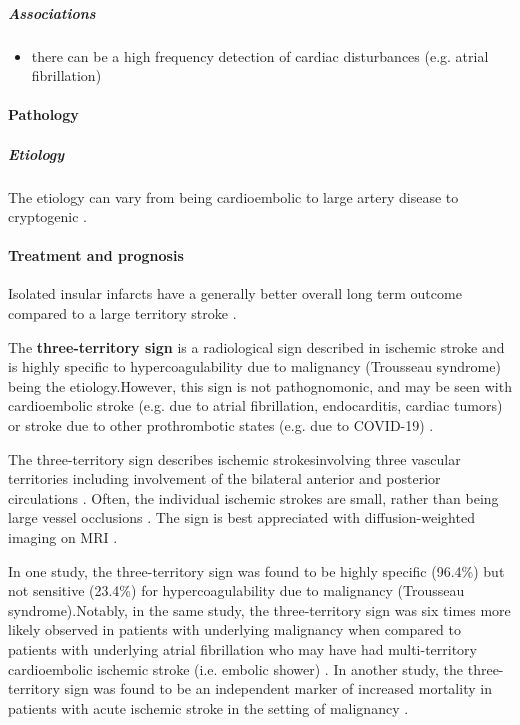\subparagraph{Associations}

\begin{itemize}
	\tightlist
	\item
	there can be a high frequency detection of cardiac disturbances (e.g. atrial fibrillation) 
\end{itemize}

\paragraph{Pathology}

\subparagraph{Etiology}

The etiology can vary from being cardioembolic to large artery disease to cryptogenic .

\paragraph{Treatment and prognosis}

Isolated insular infarcts have a generally better overall long term outcome compared to a large territory stroke .

\begin{tcolorbox}[colback=blue!5!white,colframe=blue!75!white,title=Three territory sign]
	The \textbf{three-territory sign} is a radiological sign described in ischemic stroke and is highly specific to hypercoagulability due to malignancy (Trousseau syndrome) being the etiology.However, this sign is not pathognomonic, and may be seen with cardioembolic stroke (e.g. due to atrial fibrillation, endocarditis, cardiac tumors) or stroke due to other prothrombotic states (e.g. due to COVID-19) .
	
	The three-territory sign describes ischemic strokesinvolving three vascular territories including involvement of the bilateral anterior and posterior circulations . Often, the individual ischemic strokes are small, rather than being large vessel occlusions . The sign is best appreciated with diffusion-weighted imaging on MRI .
	
	In one study, the three-territory sign was found to be highly specific (96.4\%) but not sensitive (23.4\%) for hypercoagulability due to malignancy (Trousseau syndrome).Notably, in the same study, the three-territory sign was six times more likely observed in patients with underlying malignancy when compared to patients with underlying atrial fibrillation who may have had multi-territory cardioembolic ischemic stroke (i.e. embolic shower) . In another study, the three-territory sign was found to be an independent marker of increased mortality in patients with acute ischemic stroke in the setting of malignancy .
\end{tcolorbox}

